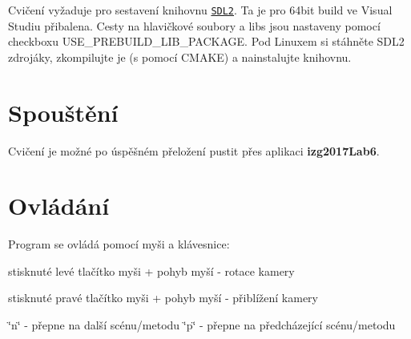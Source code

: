Cvičení vyžaduje pro sestavení knihovnu \href{https://www.libsdl.org/download-2.0.php}{\tt S\+D\+L2}. Ta je pro 64bit build ve Visual Studiu přibalena. Cesty na hlavičkové soubory a libs jsou nastaveny pomocí checkboxu U\+S\+E\+\_\+\+P\+R\+E\+B\+U\+I\+L\+D\+\_\+\+L\+I\+B\+\_\+\+P\+A\+C\+K\+A\+G\+E. Pod Linuxem si stáhněte S\+D\+L2 zdrojáky, zkompilujte je (s pomocí C\+M\+A\+K\+E) a nainstalujte knihovnu.\hypertarget{index_spousteni}{}\section{Spouštění}\label{index_spousteni}
Cvičení je možné po úspěšném přeložení pustit přes aplikaci {\bfseries izg2017\+Lab6}.\hypertarget{index_ovladani}{}\section{Ovládání}\label{index_ovladani}
Program se ovládá pomocí myši a klávesnice\+:
\begin{DoxyItemize}
\item stisknuté levé tlačítko myši + pohyb myší -\/ rotace kamery
\item stisknuté pravé tlačítko myši + pohyb myší -\/ přiblížení kamery
\item \char`\"{}n\char`\"{} -\/ přepne na další scénu/metodu \char`\"{}p\char`\"{} -\/ přepne na předcházející scénu/metodu 
\end{DoxyItemize}
